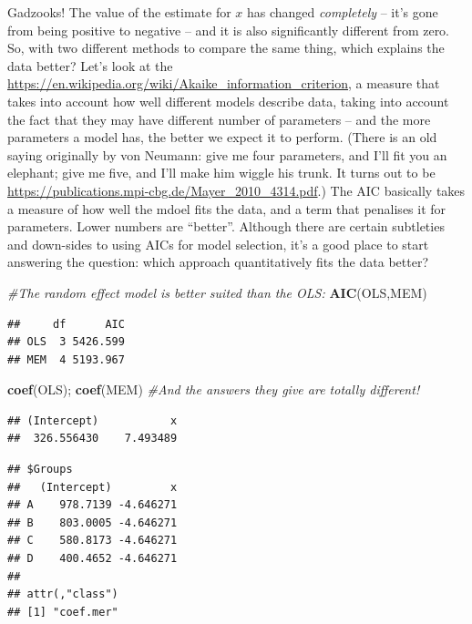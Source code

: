 \documentclass[]{book}
\newenvironment{Shaded}{\begin{snugshade}}{\end{snugshade}}
\newcommand{\CommentTok}[1]{\textcolor[rgb]{0.56,0.35,0.01}{\textit{#1}}}
\newcommand{\KeywordTok}[1]{\textcolor[rgb]{0.13,0.29,0.53}{\textbf{#1}}}
\newcommand{\NormalTok}[1]{#1}
\begin{document}
Gadzooks! The value of the estimate for \(x\) has changed \emph{completely} -- it's gone from being positive to negative -- and it is also significantly different from zero. So, with two different methods to compare the same thing, which explains the data better? Let's look at the \href{Akaike\%20information\%20criterion}{https://en.wikipedia.org/wiki/Akaike\_information\_criterion}, a measure that takes into account how well different models describe data, taking into account the fact that they may have different number of parameters -- and the more parameters a model has, the better we expect it to perform. (There is an old saying originally by von Neumann: give me four parameters, and I'll fit you an elephant; give me five, and I'll make him wiggle his trunk. It turns out to be \href{true}{https://publications.mpi-cbg.de/Mayer\_2010\_4314.pdf}.) The AIC basically takes a measure of how well the mdoel fits the data, and a term that penalises it for parameters. Lower numbers are ``better''. Although there are certain subtleties and down-sides to using AICs for model selection, it's a good place to start answering the question: which approach quantitatively fits the data better?

\begin{Shaded}
\begin{Highlighting}[]
\CommentTok{#The random effect model is better suited than the OLS:}
\KeywordTok{AIC}\NormalTok{(OLS,MEM)}
\end{Highlighting}
\end{Shaded}

\begin{verbatim}
##     df      AIC
## OLS  3 5426.599
## MEM  4 5193.967
\end{verbatim}

\begin{Shaded}
\begin{Highlighting}[]
\KeywordTok{coef}\NormalTok{(OLS); }\KeywordTok{coef}\NormalTok{(MEM) }\CommentTok{#And the answers they give are totally different!}
\end{Highlighting}
\end{Shaded}

\begin{verbatim}
## (Intercept)           x 
##  326.556430    7.493489
\end{verbatim}

\begin{verbatim}
## $Groups
##   (Intercept)         x
## A    978.7139 -4.646271
## B    803.0005 -4.646271
## C    580.8173 -4.646271
## D    400.4652 -4.646271
## 
## attr(,"class")
## [1] "coef.mer"
\end{verbatim}
\end{document}

